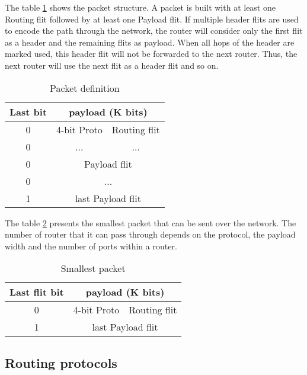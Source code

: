 The table \ref{packet_definition} shows the packet structure. A packet is built with at least one Routing flit followed
by at least one Payload flit. If multiple header flits are used to encode the path through the network, the router will
consider only the first flit as a header and the remaining flits as payload. When all hops of the header are marked
used, this header flit will not be forwarded to the next router. Thus, the next router will use the next flit as a
header flit and so on.

\begin{table}[h]
  \centering
  \begin{tabular}{c | c | c}
    \toprule\hline
    \textbf{Last bit} & \multicolumn{2}{c}{\textbf{payload (K bits)}} \\
    \hline\hline
    0 & 4-bit Proto & Routing flit \\
    \hline
    0 & ... & ... \\
    \hline
    0 & \multicolumn{2}{c}{Payload flit} \\
    \hline
    0 & \multicolumn{2}{c}{...} \\
    \hline
    1 & \multicolumn{2}{c}{last Payload flit} \\
    \hline\bottomrule
  \end{tabular}
  \caption{\label{packet_definition} Packet definition}
\end{table}


The table \ref{smallest_packet} presents the smallest packet that can be sent over the network. The number of router
that it can pass through depends on the protocol, the payload width and the number of ports within a router.

\begin{table}[h]
  \centering
  \begin{tabular}{c | c | c}
    \toprule\hline
    \textbf{Last flit bit} & \multicolumn{2}{c}{\textbf{payload (K bits)}} \\
    \hline\hline
    0 & 4-bit Proto & Routing flit \\
    \hline
    1 & \multicolumn{2}{c}{last Payload flit} \\
    \hline\bottomrule
  \end{tabular}
  \caption{\label{smallest_packet} Smallest packet}
\end{table}


\subsection{Routing protocols}

